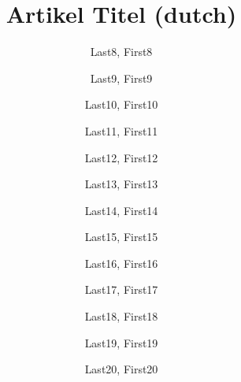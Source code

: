%
\title{Artikel Titel (dutch)}
\author[affiliation={Affiliation 8}]{Last8, First8}
\author[affiliation={Affiliation 9}]{Last9, First9}
\author[affiliation={Affiliation 10}]{Last10, First10}
\author[affiliation={Affiliation 11}]{Last11, First11}
\author[affiliation={Affiliation 12}]{Last12, First12}
\author[affiliation={Affiliation 13}]{Last13, First13}
\author[affiliation={Affiliation 14}]{Last14, First14}
\author[affiliation={Affiliation 15}]{Last15, First15}
\author[affiliation={Affiliation 16}]{Last16, First16}
\author[affiliation={Affiliation 17}]{Last17, First17}
\author[affiliation={Affiliation 18}]{Last18, First18}
\author[affiliation={Affiliation 19}]{Last19, First19}
\author[affiliation={Affiliation 20}]{Last20, First20}
%

